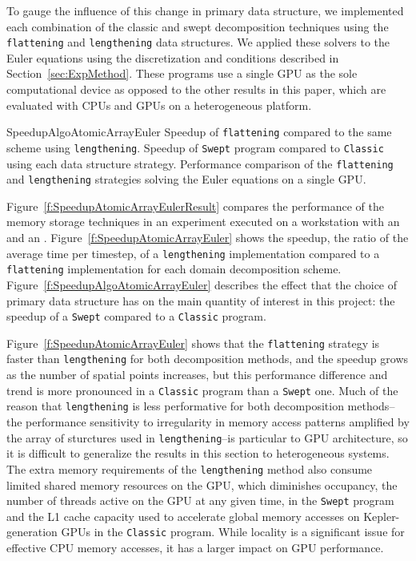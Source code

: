 To gauge the influence of this change in primary data structure, we implemented each combination of the classic and swept decomposition techniques using the \texttt{flattening} and \texttt{lengthening} data structures.
We applied these solvers to the Euler equations using the discretization and conditions described in Section~\ref{sec:ExpMethod}.
These programs use a single GPU as the sole computational device as opposed to the other results in this paper, which are evaluated with CPUs and GPUs on a heterogeneous platform.  

{SpeedupAlgoAtomicArrayEuler}
{Speedup of \texttt{flattening} compared to the same scheme using \texttt{lengthening}.}
{Speedup of \texttt{Swept} program compared to \texttt{Classic} using each data structure strategy.}
{Performance comparison of the \texttt{flattening} and \texttt{lengthening} strategies solving the Euler equations on a single GPU.}


Figure~\ref{f:SpeedupAtomicArrayEulerResult} compares the performance of the memory storage techniques in an
experiment executed on a workstation with an \WCPU{} and an \WGPU{}.
Figure~\ref{f:SpeedupAtomicArrayEuler} shows the speedup, the ratio of the average time per timestep, of a \texttt{lengthening} implementation compared to a \texttt{flattening} implementation for each domain decomposition scheme.
Figure~\ref{f:SpeedupAlgoAtomicArrayEuler} describes the effect that the choice of primary data structure has on the main quantity of interest in this project: the speedup of a \texttt{Swept} compared to a \texttt{Classic} program.

Figure~\ref{f:SpeedupAtomicArrayEuler} shows that the \texttt{flattening} strategy is faster than \texttt{lengthening} for both decomposition methods, and the speedup grows as the number of spatial points increases, but this performance difference and trend is more pronounced in a \texttt{Classic} program than a \texttt{Swept} one.
Much of the reason that \texttt{lengthening} is less performative for both decomposition methods--the performance sensitivity to irregularity in memory access patterns amplified by the array of sturctures used in \texttt{lengthening}--is particular to GPU architecture,  so it is difficult to generalize the results in this section to heterogeneous systems. 
The extra memory requirements of the \texttt{lengthening} method also consume limited shared memory resources on the GPU, which diminishes occupancy, the number of threads active on the GPU at any given time, in the \texttt{Swept} program and the L1 cache capacity used to accelerate global memory accesses on Kepler-generation GPUs in the \texttt{Classic} program.
While locality is a significant issue for effective CPU memory accesses, it has a larger impact on GPU performance.

